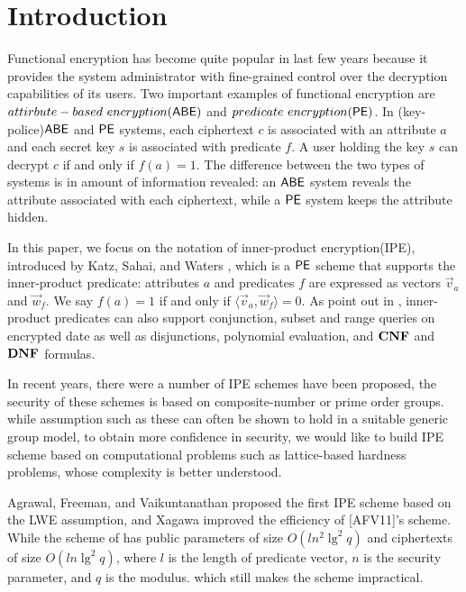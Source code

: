 \section{Introduction}
Functional encryption has become quite popular in last few years because it provides the system administrator with fine-grained control over the decryption capabilities of its users. Two important examples of functional encryption are $attirbute-based\ encryption(\ABE)$\cite{EC:SahWat05, CCS:GPSW06} and $predicate\ encryption(\mathsf{PE})\\ $\cite{TCC:BonWat07,
EC:KatSahWat08}. In (key-police)$\mathsf{ABE}$ and $\mathsf{PE}$ systems, each ciphertext $c$ is associated with an attribute $a$ and each secret key $s$ is associated with predicate $f$. A user holding the key $s$ can decrypt $c$ if and only if $f(a)=1$. The difference between the two types of systems is in amount of information revealed: an $\mathsf{ABE}$ system reveals the attribute associated with each ciphertext, while a $\mathsf{PE}$ system keeps the attribute hidden.\

In this paper, we focus on the notation of inner-product encryption(IPE), introduced by Katz, Sahai, and Waters \cite{EC:KatSahWat08}, which is a $\mathsf{PE}$ scheme that supports the inner-product predicate: attributes $a$ and predicates $f$ are expressed as vectors $\overrightarrow{v}_{a}$ and $\overrightarrow{w}_{f}$. We say $f(a)=1$ if and only if $\langle \overrightarrow{v}_{a}, \overrightarrow{w}_{f} \rangle=0$. As point out in  \cite{EC:KatSahWat08}, inner-product predicates can also support conjunction, subset and range queries on encrypted date\cite{TCC:BonWat07} as well as disjunctions, polynomial evaluation, and $\mathbf{CNF}$ and $\mathbf{DNF}$ formulas\cite{EC:KatSahWat08}.\

In recent years, there were a number of IPE schemes\cite{EC:KatSahWat08, AC:OkaTak09, EC:LOSTW10, C:OkaTak10, PKC:AttLib10, Park2011Inner, CANS:OkaTak11, EC:OkaTak12} have been proposed, the security of these schemes is based on composite-number or prime order groups. while assumption such as these can often be shown to hold in a suitable generic group model, to obtain more confidence in security, we would like to build IPE scheme based on computational problems such as lattice-based hardness problems, whose complexity is better understood.\

Agrawal, Freeman, and Vaikuntanathan\cite{AC:AgrFreVai11} proposed the first IPE scheme based on the LWE assumption, and Xagawa\cite{PKC:Xagawa13} improved the efficiency of [AFV11]'s scheme. While the scheme of \cite{PKC:Xagawa13} has public parameters of size $O(l n^{2}\lg^{2}q)$ and ciphertexts of size $O(l n\lg^{2}q)$, where $l$ is the length of predicate vector, $n$ is the security parameter, and $q$ is the modulus. which still makes the scheme impractical.

